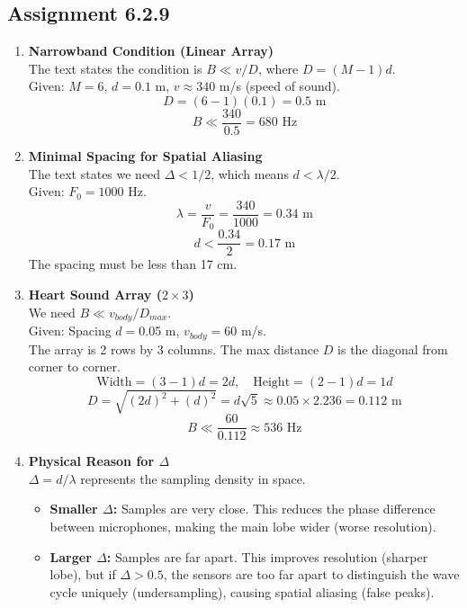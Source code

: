 \subsection{Assignment 6.2.9}

\begin{enumerate}
    \item \textbf{Narrowband Condition (Linear Array)} \\
    The text states the condition is $B \ll v/D$, where $D = (M-1)d$. \\
    Given: $M=6$, $d=0.1$ m, $v \approx 340$ m/s (speed of sound).
    $$ D = (6-1)(0.1) = 0.5 \text{ m} $$
    $$ B \ll \frac{340}{0.5} = 680 \text{ Hz} $$
    
    \item \textbf{Minimal Spacing for Spatial Aliasing} \\
    The text states we need $\Delta < 1/2$, which means $d < \lambda/2$. \\
    Given: $F_0 = 1000$ Hz.
    $$ \lambda = \frac{v}{F_0} = \frac{340}{1000} = 0.34 \text{ m} $$
    $$ d < \frac{0.34}{2} = 0.17 \text{ m} $$
    The spacing must be less than 17 cm.

    \item \textbf{Heart Sound Array ($2 \times 3$)} \\
    We need $B \ll v_{body}/D_{max}$. \\
    Given: Spacing $d=0.05$ m, $v_{body} = 60$ m/s. \\
    The array is 2 rows by 3 columns. The max distance $D$ is the diagonal from corner to corner.
    $$ \text{Width} = (3-1)d = 2d, \quad \text{Height} = (2-1)d = 1d $$
    $$ D = \sqrt{(2d)^2 + (d)^2} = d\sqrt{5} \approx 0.05 \times 2.236 = 0.112 \text{ m} $$
    $$ B \ll \frac{60}{0.112} \approx 536 \text{ Hz} $$

    \item \textbf{Physical Reason for $\Delta$} \\
    $\Delta = d/\lambda$ represents the sampling density in space.
    \begin{itemize}
        \item \textbf{Smaller $\Delta$:} Samples are very close. This reduces the phase difference between microphones, making the main lobe wider (worse resolution).
        \item \textbf{Larger $\Delta$:} Samples are far apart. This improves resolution (sharper lobe), but if $\Delta > 0.5$, the sensors are too far apart to distinguish the wave cycle uniquely (undersampling), causing spatial aliasing (false peaks).
    \end{itemize}
\end{enumerate}



